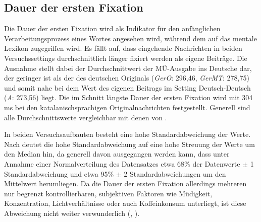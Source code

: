 \subsection{Dauer der ersten Fixation}
\label{K7:subsec:ffdur}


Die Dauer der ersten Fixation wird als Indikator für den anfänglichen Verarbeitungsprozess eines Wortes angesehen wird, während dem auf das mentale Lexikon zugegriffen wird. Es fällt auf, dass eingehende Nachrichten in beiden Versuchssettings durchschnittlich länger fixiert werden als eigene Beiträge. Die Ausnahme stellt dabei der Durchschnittwert der MÜ-Ausgabe ins Deutsche dar, der geringer ist als der des deutschen Originals (\emph{GerO}: 296,46, \emph{GerMT}: 278,75) und somit nahe bei dem Wert des eigenen Beitrags im Setting Deutsch-Deutsch (\emph{A}: 273,56) liegt. Die im Schnitt längste Dauer der ersten Fixation wird mit 304\,ms bei den katalanischsprachigen Originalnachrichten festgestellt. Generell sind alle Durchschnittswerte vergleichbar mit denen von \citet[382]{holmqvist_eye_2011}.

In beiden Versuchsaufbauten besteht eine hohe Standardabweichung der Werte. Nach \citet[7]{dormann_parametrische_2013} deutet die hohe Standardabweichung auf eine hohe Streuung der Werte um den Median hin, da generell davon ausgegangen werden kann, dass unter Annahme einer Normalverteilung des Datensatzes \glqq etwa 68\% der Datenwerte $\pm$ 1 Standardabweichung und etwa 95\% $\pm$ 2 Standardabweichungen um den Mittelwert\grqq{} \citep[7]{dormann_parametrische_2013} herumliegen. Da die Dauer der ersten Fixation allerdings mehreren nur begrenzt kontrollierbaren, subjektiven Faktoren wie Müdigkeit, Konzentration, Lichtverhältnisse oder auch Koffeinkonsum unterliegt, ist diese Abweichung nicht weiter verwunderlich (\citealt[376]{rayner_eye_1998}, \citealt[][378\psq]{holmqvist_eye_2011}).

